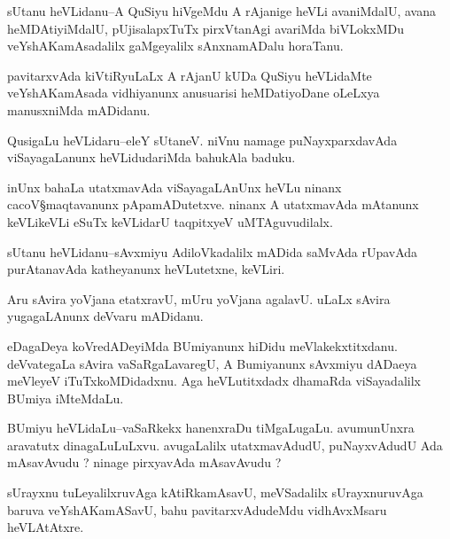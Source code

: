 \documentclass{article}
\begin{document}
\begin{mn}%
sUtanu heVLidanu--A QuSiyu hiVgeMdu A rAjanige heVLi avaniMdalU, avana heMDAtiyiMdalU, 
pUjisalapxTuTx pirxVtanAgi avariMda biVLokxMDu veYshAKamAsadalilx gaMgeyalilx 
sAnxnamADalu horaTanu.
\end{mn}

\begin{mn}%
pavitarxvAda kiVtiRyuLaLx A rAjanU kUDa QuSiyu heVLidaMte veYshAKamAsada vidhiyanunx 
anusuarisi heMDatiyoDane oLeLxya manusxniMda mADidanu.
\end{mn}


\begin{mn}%
QusigaLu heVLidaru--eleY sUtaneV. niVnu namage puNayxparxdavAda viSayagaLanunx 
heVLidudariMda bahukAla baduku. 
\end{mn}

\begin{mn}%
inUnx bahaLa utatxmavAda viSayagaLAnUnx heVLu ninanx cacoV\S maqtavanunx pApamADutetxve. 
ninanx A utatxmavAda mAtanunx keVLikeVLi eSuTx keVLidarU taqpitxyeV uMTAguvudilalx.
\end{mn}

\begin{mn}%
sUtanu heVLidanu--sAvxmiyu AdiloVkadalilx mADida saMvAda rUpavAda purAtanavAda katheyanunx 
heVLutetxne, keVLiri.
\end{mn}

\begin{mn}%
Aru sAvira yoVjana etatxravU, mUru yoVjana agalavU. uLaLx sAvira yugagaLAnunx deVvaru 
mADidanu.
\end{mn}

\begin{mn}%
eDagaDeya koVredADeyiMda BUmiyanunx hiDidu meVlakekxtitxdanu. deVvategaLa sAvira 
vaSaRgaLavaregU, A Bumiyanunx sAvxmiyu dADaeya meVleyeV iTuTxkoMDidadxnu. Aga 
heVLutitxdadx dhamaRda viSayadalilx BUmiya iMteMdaLu.
\end{mn}

\begin{mn}%
BUmiyu heVLidaLu--vaSaRkekx hanenxraDu tiMgaLugaLu. avumunUnxra aravatutx dinagaLuLuLxvu. 
avugaLalilx utatxmavAdudU, puNayxvAdudU Ada mAsavAvudu ? ninage pirxyavAda mAsavAvudu ?
\end{mn}

\begin{mn}%
sUrayxnu tuLeyalilxruvAga kAtiRkamAsavU, meVSadalilx sUrayxnuruvAga baruva veYshAKamASavU, 
bahu pavitarxvAdudeMdu vidhAvxMsaru heVLAtAtxre.
\end{mn}
\end{document}
